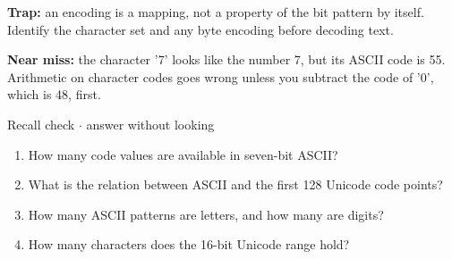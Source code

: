 \documentclass[11pt]{article}
\begin{document}
\begin{keepsection}
\begin{keepsection}
\begin{notebox}\textbf{Trap:} an encoding is a mapping, not a property of the bit pattern by itself. Identify the character set and any byte encoding before decoding text.\end{notebox}

\begin{notebox}\textbf{Near miss:} the character '7' looks like the number 7, but its ASCII code is 55. Arithmetic on character codes goes wrong unless you subtract the code of '0', which is 48, first.\end{notebox}

\begin{recallbox}{Recall check \ensuremath{\cdot} answer without looking}
\begin{enumerate}
\item How many code values are available in seven-bit ASCII?
\item What is the relation between ASCII and the first 128 Unicode code points?
\item How many ASCII patterns are letters, and how many are digits?
\item How many characters does the 16-bit Unicode range hold?
\end{enumerate}

\end{recallbox}
\end{keepsection}
\end{keepsection}
\end{document}
